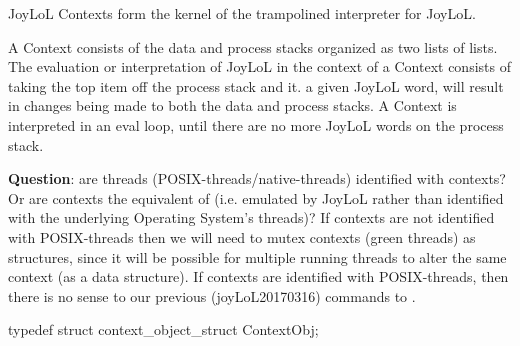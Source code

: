 
\startsection[title=Goals]

JoyLoL Contexts form the kernel of the trampolined interpreter for JoyLoL. 

A Context consists of the data and process stacks organized as two lists 
of lists. The evaluation or interpretation of JoyLoL in the context of a 
Context consists of taking the top item off the process stack and 
 it.  a given JoyLoL word, will result 
in changes being made to both the data and process stacks. A Context is 
interpreted in an eval loop, until there are no more JoyLoL words on the 
process stack. 

{\bf Question}: are threads (POSIX-threads/native-threads) identified with 
contexts? Or are contexts the equivalent of  (i.e. 
 emulated by JoyLoL rather than identified with the 
underlying Operating System's threads)? If contexts are not identified 
with POSIX-threads then we will need to mutex contexts (green threads) as 
 structures, since it will be possible for multiple running 
threads to alter the same context (as a data structure). If contexts are 
identified with POSIX-threads, then there is no sense to our previous 
(joyLoL20170316) commands to . 

\startCHeader
typedef struct context_object_struct ContextObj;
\stopCHeader
